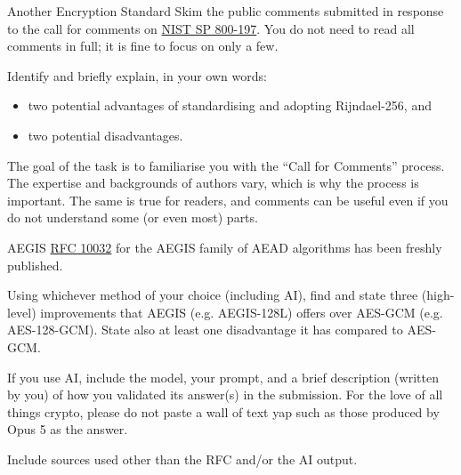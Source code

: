 \documentclass{homework}
\begin{document}
\begin{task}{Another Encryption Standard}
  Skim the public comments submitted in response to the call for comments on \href{https://csrc.nist.gov/pubs/sp/800/197/iprd}{NIST SP 800-197}.
  You do not need to read all comments in full; it is fine to focus on only a few.

  Identify and briefly explain, in your own words:
  \begin{itemize}
    \item two potential advantages of standardising and adopting Rijndael-256, and
    \item two potential disadvantages.
  \end{itemize}

  The goal of the task is to familiarise you with the \enquote{Call for Comments} process.
  The expertise and backgrounds of authors vary, which is why the process is important.
  The same is true for readers, and comments can be useful even if you do not understand some (or even most) parts.
\end{task}

\begin{task}{AEGIS}
  \href{https://datatracker.ietf.org/doc/html/rfc10032}{RFC 10032} for the AEGIS family of AEAD algorithms has been freshly published.

  Using whichever method of your choice (including AI), find and state three (high-level) improvements that AEGIS (e.g. AEGIS-128L) offers over AES-GCM (e.g. AES-128-GCM).
  State also at least one disadvantage it has compared to AES-GCM.

  If you use AI, include the model, your prompt, and a brief description (written by you) of how you validated its answer(s) in the submission.
  For the love of all things crypto, please do not paste a wall of text yap such as those produced by Opus 5 as the answer.
  
  Include sources used other than the RFC and/or the AI output.
\end{task}
\end{document}
